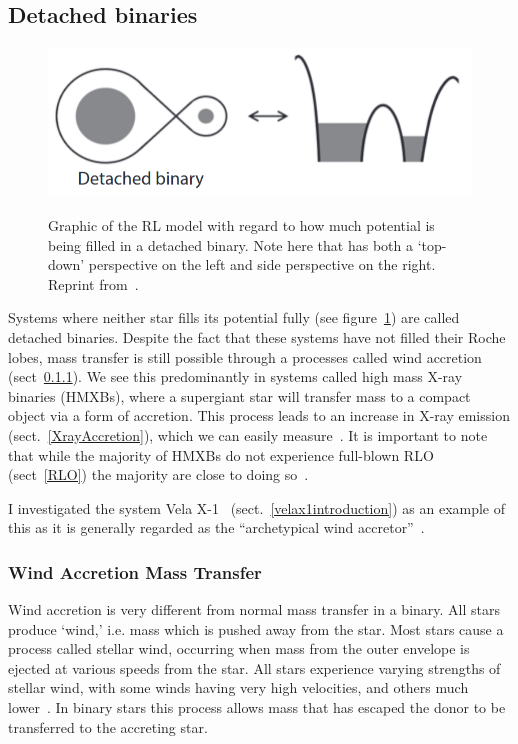 \documentclass[12pt, a4paper]{article}
\begin{document}
        \subsection{Detached binaries}\label{DetachedBinary}

        \begin{figure}[H]
            \centering
            \includegraphics[scale = .4]{figs/reused-figs/Tauris_DetachedBinary.png}\\
            \caption{Graphic of the RL model with regard to how much potential is being filled in a detached binary. Note here that has both a `top-down' perspective on the left and side perspective on the right. Reprint from~\parencite{TaurisvandenHeuvel+2023}.} 
            \label{DetachedBinaryRL}
        \end{figure}

        Systems where neither star fills its potential fully (see figure~\ref{DetachedBinaryRL}) are called detached binaries. Despite the fact that these systems have not filled their Roche lobes, mass transfer is still possible through a processes called wind accretion (sect~\ref{WindAccretion}). We see this predominantly in systems called high mass X-ray binaries (HMXBs), where a supergiant star will transfer mass to a compact object via a form of accretion. This process leads to an increase in X-ray emission (sect.~\ref{XrayAccretion}), which we can easily measure~\parencite{TaurisvandenHeuvel+2023}. It is important to note that while the majority of HMXBs do not experience full-blown RLO (sect~\ref{RLO}) the majority are close to doing so~\parencite{TaurisvandenHeuvel+2023}. 

        I investigated the system Vela X-1~\parencite{Kretschmar_2021} (sect.~\ref{velax1introduction}) as an example of this as it is generally regarded as the ``archetypical wind accretor''~\parencite{Kretschmar_2021}. 

        \subsubsection{Wind Accretion Mass Transfer} \label{WindAccretion}
        Wind accretion is very different from normal mass transfer in a binary. All stars produce `wind,' i.e. mass which is pushed away from the star. Most stars cause a process called stellar wind, occurring when mass from the outer envelope is ejected at various speeds from the star. All stars experience varying strengths of stellar wind, with some winds having very high velocities, and others much lower~\parencite{Lamers_1999}. In binary stars this process allows mass that has escaped the donor to be transferred to the accreting star.
\end{document}

